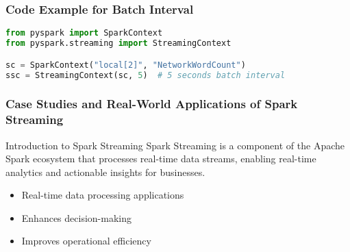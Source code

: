 \documentclass[aspectratio=169]{beamer}
\begin{document}
\begin{frame}[fragile]
    \frametitle{Code Example for Batch Interval}
    \begin{lstlisting}[language=Python]
from pyspark import SparkContext
from pyspark.streaming import StreamingContext

sc = SparkContext("local[2]", "NetworkWordCount")
ssc = StreamingContext(sc, 5)  # 5 seconds batch interval
    \end{lstlisting}
\end{frame}

\begin{frame}[fragile]
    \frametitle{Case Studies and Real-World Applications of Spark Streaming}

    \begin{block}{Introduction to Spark Streaming}
        Spark Streaming is a component of the Apache Spark ecosystem that processes real-time data streams, enabling real-time analytics and actionable insights for businesses.
    \end{block}

    \begin{itemize}
        \item Real-time data processing applications
        \item Enhances decision-making
        \item Improves operational efficiency
    \end{itemize}
\end{frame}
\end{document}
